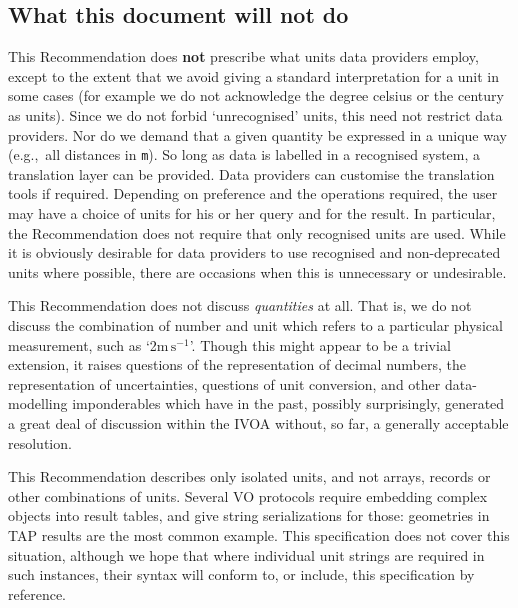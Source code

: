 \documentclass[11pt,notitlepage,onecolumn]{ivoa}
\def\eg{e.g.,~}
\newcommand{\unit}[1]{\texttt{\small\color{orange}#1}}
\begin{document}
\subsection{What this document will not do}
\label{sec:outofscope}

This Recommendation does \textbf{not} prescribe what units data
providers employ, except to the extent that we avoid giving a standard
interpretation for a unit in some cases (for example we do not
acknowledge the degree celsius or the century as units).  Since we do
not forbid `unrecognised' units, this need not restrict data providers.
Nor do we demand that a given quantity be expressed in a
unique way (\eg all distances in \unit{m}).  So long as data is
labelled in a recognised system, a translation layer can be
provided. Data providers can customise the translation tools if
required. Depending on preference and the operations required, the
user may have a choice of units for his or her query and for the
result.  In particular, the Recommendation does not require that only
recognised units are used.  While it is obviously desirable for data
providers to use recognised and non-deprecated units where possible,
there are occasions when this is unnecessary or undesirable.

This Recommendation does not discuss \emph{quantities} at all.  That
is, we do not discuss the combination of number and unit which refers
to a particular physical measurement, such as `2$\mathrm m\,\mathrm
s^{-1}$'.  Though this might appear to be a trivial extension, it
raises questions of the representation of decimal numbers, the
representation of uncertainties, questions of unit conversion, and
other data-modelling imponderables which have in the past, possibly
surprisingly, generated a great deal of discussion within the
IVOA without, so far, a generally acceptable resolution.

This Recommendation describes only isolated units, and not arrays,
records or other combinations of units.  Several VO protocols require
embedding complex objects into result tables, and give string
serializations for those: geometries in TAP results are the most
common example.  This specification does not cover this situation,
although we hope that where individual unit strings are required in
such instances, their syntax will conform to, or include, this
specification by reference.
\end{document}
